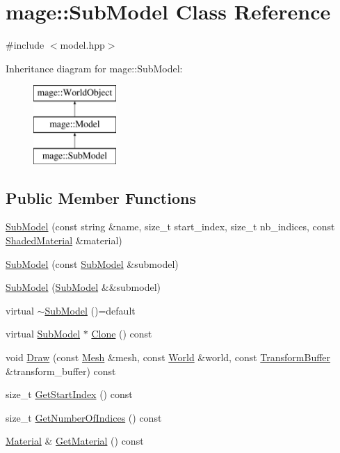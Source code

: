 \hypertarget{classmage_1_1_sub_model}{}\section{mage\+:\+:Sub\+Model Class Reference}
\label{classmage_1_1_sub_model}


{\ttfamily \#include $<$model.\+hpp$>$}

Inheritance diagram for mage\+:\+:Sub\+Model\+:\begin{figure}[H]
\begin{center}
\leavevmode
\includegraphics[height=3.000000cm]{classmage_1_1_sub_model}
\end{center}
\end{figure}
\subsection*{Public Member Functions}
\begin{DoxyCompactItemize}
\item 
\hyperlink{classmage_1_1_sub_model_a26dce7b076af1edb4209d0a236a250ef}{Sub\+Model} (const string \&name, size\+\_\+t start\+\_\+index, size\+\_\+t nb\+\_\+indices, const \hyperlink{structmage_1_1_shaded_material}{Shaded\+Material} \&material)
\item 
\hyperlink{classmage_1_1_sub_model_ae71dcb72fc1b06710b390c97a2db1d68}{Sub\+Model} (const \hyperlink{classmage_1_1_sub_model}{Sub\+Model} \&submodel)
\item 
\hyperlink{classmage_1_1_sub_model_a3813e71a2904ee9edf3e3788d96eb2c7}{Sub\+Model} (\hyperlink{classmage_1_1_sub_model}{Sub\+Model} \&\&submodel)
\item 
virtual \hyperlink{classmage_1_1_sub_model_a75853fd4a6435f074f13eab9c73b695b}{$\sim$\+Sub\+Model} ()=default
\item 
virtual \hyperlink{classmage_1_1_sub_model}{Sub\+Model} $\ast$ \hyperlink{classmage_1_1_sub_model_a368bcc2ee819cc29ec0203e314ae91d3}{Clone} () const
\item 
void \hyperlink{classmage_1_1_sub_model_a16400e2d0cc14a38fba18971e227d2ee}{Draw} (const \hyperlink{classmage_1_1_mesh}{Mesh} \&mesh, const \hyperlink{classmage_1_1_world}{World} \&world, const \hyperlink{structmage_1_1_transform_buffer}{Transform\+Buffer} \&transform\+\_\+buffer) const
\item 
size\+\_\+t \hyperlink{classmage_1_1_sub_model_a2b901cb62dca26a7ff399719e0a4ba66}{Get\+Start\+Index} () const
\item 
size\+\_\+t \hyperlink{classmage_1_1_sub_model_a18736678fc1a5d882776298053e037b3}{Get\+Number\+Of\+Indices} () const
\item 
\hyperlink{structmage_1_1_material}{Material} \& \hyperlink{classmage_1_1_sub_model_af993f41f73a72df9fca154083c5f7410}{Get\+Material} () const
\end{DoxyCompactItemize}
